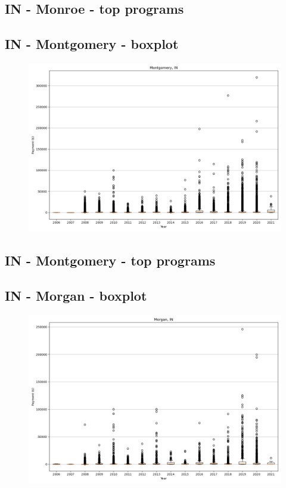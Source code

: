 \subsection*{IN - Monroe - top programs}

\newpage
\subsection*{IN - Montgomery - boxplot}
\begin{figure}[h]
\centering
\includegraphics[width=7in]{../output/boxplots/counties/Montgomery-IN_boxplot.png}
\end{figure}


\subsection*{IN - Montgomery - top programs}

\newpage
\subsection*{IN - Morgan - boxplot}
\begin{figure}[h]
\centering
\includegraphics[width=7in]{../output/boxplots/counties/Morgan-IN_boxplot.png}
\end{figure}


